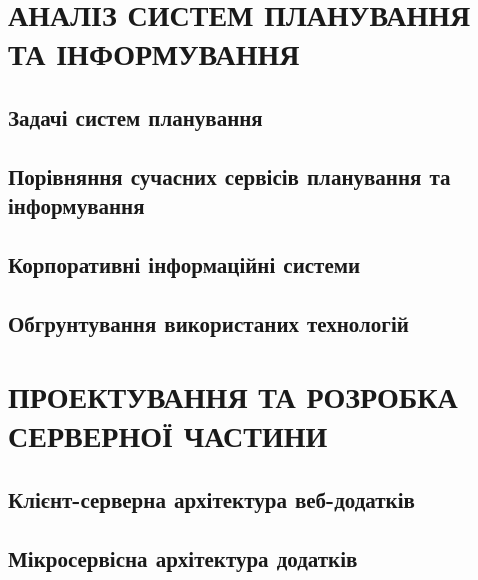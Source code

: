 \documentclass[a4paper,14pt]{extarticle} %
\begin{document}

\tableofcontents %
\clearpage


\section{АНАЛІЗ СИСТЕМ ПЛАНУВАННЯ ТА ІНФОРМУВАННЯ}
\subsection{Задачі систем планування} 

\subsection{Порівняння сучасних сервісів планування та інформування} 




\subsection{Корпоративні інформаційні системи} 



\subsection{Обгрунтування використаних технологій} 







\section{ПРОЕКТУВАННЯ ТА РОЗРОБКА СЕРВЕРНОЇ ЧАСТИНИ}

\subsection{Клієнт-серверна архітектура веб-додатків} 

\subsection{Мікросервісна архітектура додатків} 
\end{document}
